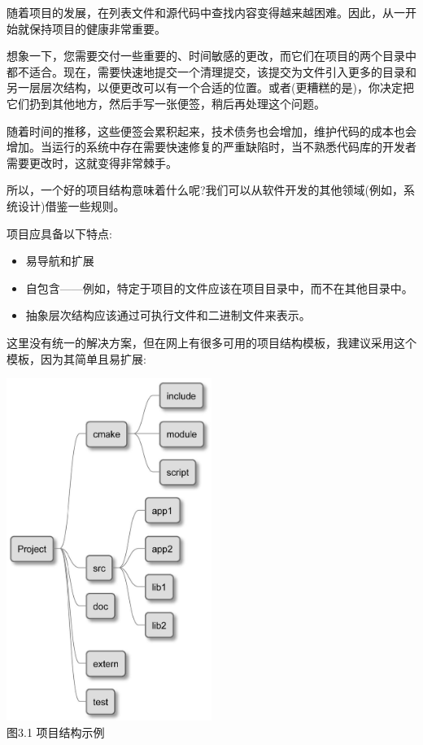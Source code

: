 随着项目的发展，在列表文件和源代码中查找内容变得越来越困难。因此，从一开始就保持项目的健康非常重要。

想象一下，您需要交付一些重要的、时间敏感的更改，而它们在项目的两个目录中都不适合。现在，需要快速地提交一个清理提交，该提交为文件引入更多的目录和另一层层次结构，以便更改可以有一个合适的位置。或者(更糟糕的是)，你决定把它们扔到其他地方，然后手写一张便签，稍后再处理这个问题。

随着时间的推移，这些便签会累积起来，技术债务也会增加，维护代码的成本也会增加。当运行的系统中存在需要快速修复的严重缺陷时，当不熟悉代码库的开发者需要更改时，这就变得非常棘手。

所以，一个好的项目结构意味着什么呢?我们可以从软件开发的其他领域(例如，系统设计)借鉴一些规则。

项目应具备以下特点:

\begin{itemize}
\item 
易导航和扩展

\item 
自包含——例如，特定于项目的文件应该在项目目录中，而不在其他目录中。

\item 
抽象层次结构应该通过可执行文件和二进制文件来表示。
\end{itemize}

这里没有统一的解决方案，但在网上有很多可用的项目结构模板，我建议采用这个模板，因为其简单且易扩展:

\begin{center}
\includegraphics[width=0.5\textwidth]{content/1/chapter3/images/1.jpg}\\
图3.1 项目结构示例
\end{center}

